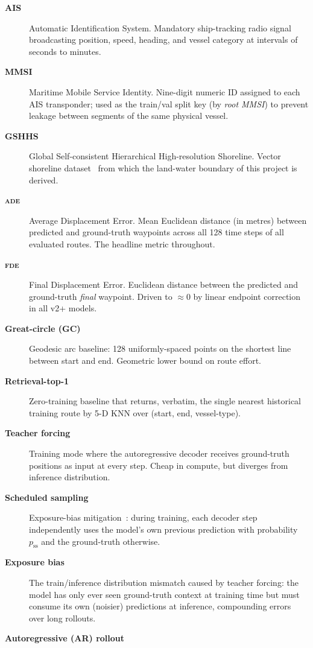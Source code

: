 \documentclass[11pt,a4paper]{article}
\newcommand{\ade}{\textsc{ade}}
\newcommand{\fde}{\textsc{fde}}
\begin{document}
\begin{description}
\item[\textbf{AIS}]
Automatic Identification System.  Mandatory ship-tracking radio signal
broadcasting position, speed, heading, and vessel category at intervals of
seconds to minutes.
\item[\textbf{MMSI}]
Maritime Mobile Service Identity. Nine-digit numeric ID assigned to each AIS
transponder; used as the train/val split key (by \emph{root MMSI}) to
prevent leakage between segments of the same physical vessel.
\item[\textbf{GSHHS}]
Global Self-consistent Hierarchical High-resolution Shoreline. Vector
shoreline dataset~\cite{wessel1996gshhs} from which the land-water boundary
of this project is derived.
\item[\textbf{\ade{}}]
Average Displacement Error. Mean Euclidean distance (in metres)
between predicted and ground-truth waypoints across all 128 time steps
of all evaluated routes. The headline metric throughout.
\item[\textbf{\fde{}}]
Final Displacement Error. Euclidean distance between the predicted and
ground-truth \emph{final} waypoint. Driven to $\approx 0$ by linear
endpoint correction in all v2+ models.
\item[\textbf{Great-circle (GC)}]
Geodesic arc baseline: 128 uniformly-spaced points on the shortest line
between start and end. Geometric lower bound on route effort.
\item[\textbf{Retrieval-top-1}]
Zero-training baseline that returns, verbatim, the single nearest
historical training route by 5-D KNN over (start, end, vessel-type).
\item[\textbf{Teacher forcing}]
Training mode where the autoregressive decoder receives ground-truth
positions as input at every step. Cheap in compute, but diverges from
inference distribution.
\item[\textbf{Scheduled sampling}]
Exposure-bias mitigation~\cite{bengio2015scheduled}: during training,
each decoder step independently uses the model's own previous prediction
with probability $p_\text{ss}$ and the ground-truth otherwise.
\item[\textbf{Exposure bias}]
The train/inference distribution mismatch caused by teacher forcing:
the model has only ever seen ground-truth context at training time but
must consume its own (noisier) predictions at inference, compounding
errors over long rollouts.
\item[\textbf{Autoregressive (AR) rollout}]

\end{description}
\end{document}
